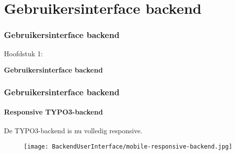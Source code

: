 %

\section{Gebruikersinterface backend}
\begin{frame}[fragile]
	\frametitle{Gebruikersinterface backend}

	\begin{center}\huge{Hoofdstuk 1:}\end{center}
	\begin{center}\huge{\color{typo3darkgrey}\textbf{Gebruikersinterface backend}}\end{center}

\end{frame}


\begin{frame}[fragile]
	\frametitle{Gebruikersinterface backend}
	\framesubtitle{Responsive TYPO3-backend}

	De TYPO3-backend is nu volledig responsive.

	\begin{figure}
		\texttt{[image: BackendUserInterface/mobile-responsive-backend.jpg]}
	\end{figure}

\end{frame}



